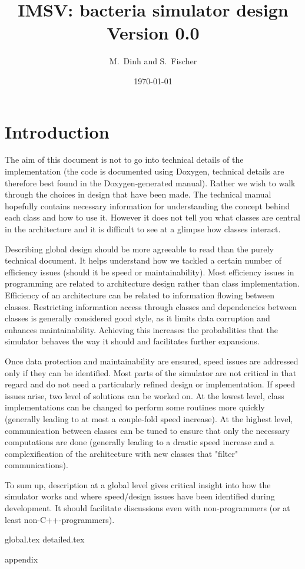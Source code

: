 \documentclass[12pt]{scrartcl}
\theoremstyle{definition}
\theoremstyle{remark}
\numberwithin{equation}{section}
\begin{document}
\title{{IMSV}: bacteria simulator design \\ Version 0.0}%
\author{M.~Dinh and S.~Fischer}%
\date{\today}%
\maketitle

\newpage

\tableofcontents

\newpage

\section{Introduction}

The aim of this document is not to go into technical details of the implementation (the code is documented using Doxygen, technical details are therefore best found in the Doxygen-generated manual). Rather we wish to walk through the choices in design that have been made. The technical manual hopefully contains necessary information for understanding the concept behind each class and how to use it. However it does not tell you what classes are central in the architecture and it is difficult to see at a glimpse how classes interact.

Describing global design should be more agreeable to read than the purely technical document. It helps understand how we tackled a certain number of efficiency issues (should it be speed or maintainability). Most efficiency issues in programming are related to architecture design rather than class implementation. Efficiency of an architecture can be related to information flowing between classes. Restricting information access through classes and dependencies between classes is generally considered good style, as it limits data corruption and enhances maintainability. Achieving this increases the probabilities that the simulator behaves the way it should and facilitates further expansions.

Once data protection and maintainability are ensured, speed issues are addressed only if they can be identified. Most parts of the simulator are not critical in that regard and do not need a particularly refined design or implementation. If speed issues arise, two level of solutions can be worked on. At the lowest level, class implementations can be changed to perform some routines more quickly (generally leading to at most a couple-fold speed increase). At the highest level, communication between classes can be tuned to ensure that only the necessary computations are done (generally leading to a drastic speed increase and a complexification of the architecture with new classes that "filter" communications).

To sum up, description at a global level gives critical insight into how the simulator works and where speed/design issues have been identified during development. It should facilitate discussions even with non-programmers (or at least non-C++-programmers).

{global.tex}
{detailed.tex}
\clearpage

\appendix
{appendix}
\clearpage
\end{document}
